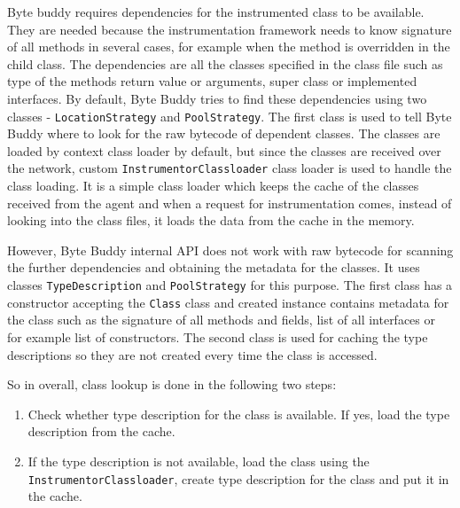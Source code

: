 Byte buddy requires dependencies for the instrumented class to be available. They are needed because the instrumentation framework needs to know signature of all methods in several cases, for example when the method is overridden in the child class. The dependencies are all the classes specified in the class file such as type of the methods return value or arguments, super class or implemented interfaces. 
By default, Byte Buddy tries to find these dependencies using two classes - \texttt{LocationStrategy} and \texttt{PoolStrategy}. The first class is used to tell Byte Buddy where to look for the raw bytecode of dependent classes. The classes are loaded by context class loader by default, but since the classes are received over the network, custom \texttt{InstrumentorClassloader} class loader is used to handle the class loading. It is a simple class loader which keeps the cache of the classes received from the agent and when a request for instrumentation comes, instead of looking into the class files, it loads the data from the cache in the memory.

However, Byte Buddy internal API does not work with raw bytecode for scanning the further dependencies and obtaining the metadata for the classes. It uses classes \texttt{TypeDescription} and \texttt{PoolStrategy} for this purpose. The first class has a constructor accepting the \texttt{Class} class and created instance contains metadata for the class such as the signature of all methods and fields, list of all interfaces or for example list of constructors. The second class is used for caching the type descriptions so they are not created every time the class is accessed. 

So in overall, class lookup is done in the following two steps:
\begin{enumerate}
	\item Check whether type description for the class is available. If yes, load the type description from the cache.
	\item If the type description is not available, load the class using the \newline \texttt{InstrumentorClassloader}, create type description for the class and put it in the cache.
\end{enumerate}

